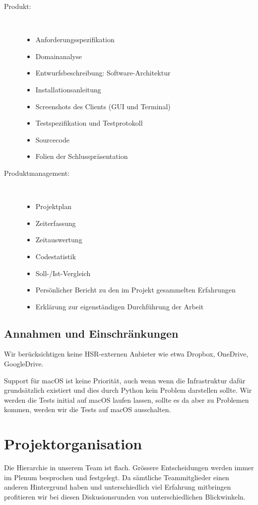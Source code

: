 \documentclass[a4paper]{article}
\let\oldsection\section
\renewcommand\section{\clearpage\oldsection}
\begin{document}
\begin{description}
	\item[Produkt:] \strut \\[-1em]
	\begin{itemize}
		\item Anforderungsspezifikation
		\item Domainanalyse
		\item Entwurfsbeschreibung: Software-Architektur
		\item Installationsanleitung
		\item Screenshots des Clients (GUI und Terminal)
		\item Testspezifikation und Testprotokoll
		\item Sourcecode
		\item Folien der Schlusspräsentation
	\end{itemize}
	\item[Produktmanagement:] \strut \\[-1em]
	\begin{itemize}
		\item Projektplan
		\item Zeiterfassung
		\item Zeitauswertung
		\item Codestatistik
		\item Soll-/Ist-Vergleich
		\item Persönlicher Bericht zu den im Projekt gesammelten Erfahrungen
		\item Erklärung zur eigenständigen Durchführung der Arbeit
	\end{itemize}
\end{description}

\subsection{Annahmen und Einschränkungen}
Wir berücksichtigen keine HSR-externen Anbieter wie etwa Dropbox, OneDrive, GoogleDrive.

Support für macOS ist keine Priorität, auch wenn wenn die Infrastruktur dafür
grundsätzlich existiert und dies durch Python kein Problem darstellen sollte.
Wir werden die Tests initial auf macOS laufen lassen, sollte es da aber zu
Problemen kommen, werden wir die Tests auf macOS ausschalten.

\section{Projektorganisation}
Die Hierarchie in unserem Team ist flach.
Grössere Entscheidungen werden immer im Plenum besprochen und festgelegt.
Da sämtliche Teammitglieder einen anderen Hintergrund haben und unterschiedlich viel Erfahrung mitbringen profitieren wir bei diesen Diskusionsrunden von unterschiedlichen Blickwinkeln.
\end{document}
